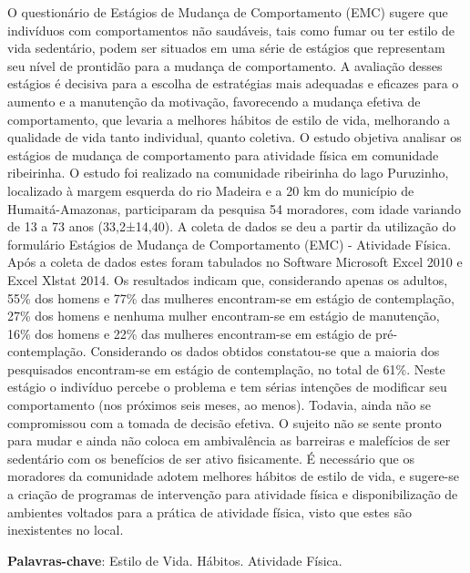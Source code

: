 \documentclass[article,12pt,onesidea,4paper,english,brazil]{abntex2}
\begin{document}
	\noindent O questionário de Estágios de Mudança de Comportamento (EMC) sugere que indivíduos com comportamentos não saudáveis, tais como fumar ou ter estilo de vida sedentário, podem ser situados em uma série de estágios que representam seu nível de prontidão para a mudança de comportamento. A avaliação desses estágios é decisiva para a escolha de estratégias mais adequadas e eficazes para o aumento e a manutenção da motivação, favorecendo a mudança efetiva de comportamento, que levaria a melhores hábitos de estilo de vida, melhorando a qualidade de vida tanto individual, quanto coletiva. O estudo objetiva analisar os estágios de mudança de comportamento para atividade física em comunidade ribeirinha. O estudo foi realizado na comunidade ribeirinha do lago Puruzinho, localizado à margem esquerda do rio Madeira e a 20 km do município de Humaitá-Amazonas, participaram da pesquisa 54 moradores, com idade variando de 13 a 73 anos (33,2±14,40). A coleta de dados se deu a partir da utilização do formulário Estágios de Mudança de Comportamento (EMC) - Atividade Física. Após a coleta de dados estes foram tabulados no Software Microsoft Excel 2010 e Excel Xlstat 2014. Os resultados indicam que, considerando apenas os adultos, 55\% dos homens e 77\% das mulheres encontram-se em estágio de contemplação, 27\% dos homens e nenhuma mulher encontram-se em estágio de manutenção, 16\% dos homens e 22\% das mulheres encontram-se em estágio de pré-contemplação. Considerando os dados obtidos constatou-se que a maioria dos pesquisados encontram-se em estágio de contemplação, no total de 61\%. Neste estágio o indivíduo percebe o problema e tem sérias intenções de modificar seu comportamento (nos próximos seis meses, ao menos). Todavia, ainda não se compromissou com a tomada de decisão efetiva. O sujeito não se sente pronto para mudar e ainda não coloca em ambivalência as barreiras e malefícios de ser sedentário com os benefícios de ser ativo fisicamente. É necessário que os moradores da comunidade adotem melhores hábitos de estilo de vida, e sugere-se a criação de programas de intervenção para atividade física e disponibilização de ambientes voltados para a prática de atividade física, visto que estes são inexistentes no local.
	
	\vspace{\onelineskip}
	
	\noindent
	\textbf{Palavras-chave}: Estilo de Vida. Hábitos. Atividade Física.
	
\end{document}
